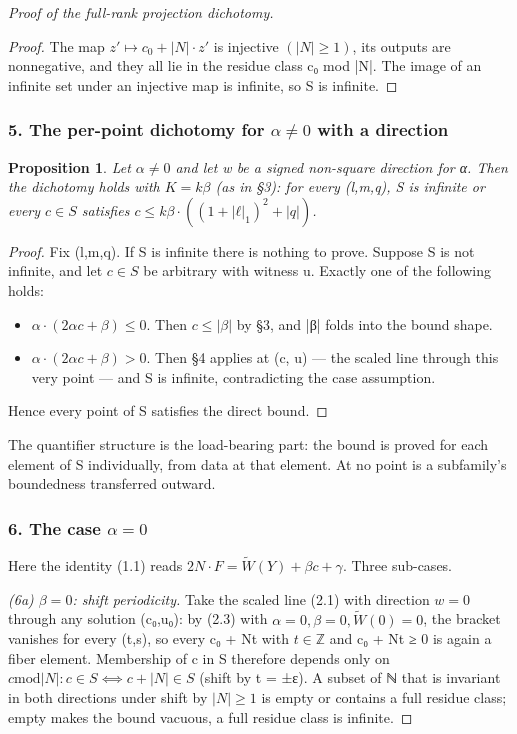 \documentclass[11pt]{article}
\theoremstyle{plain}
\theoremstyle{definition}
\theoremstyle{remark}
\theoremstyle{plain}
\newtheorem*{proposition*}{Proposition}
\theoremstyle{definition}
\theoremstyle{remark}
\theoremstyle{plain}
\theoremstyle{definition}
\theoremstyle{remark}
\begin{document}
\begin{proof}[Proof of the full-rank projection dichotomy]
\begin{proof}
The map $z′ ↦ c_{0} + |N|·z′$ is injective $(|N| ≥ 1)$, its outputs are nonnegative, and they all lie in the residue class c₀ mod |N|. The image of an infinite set under an injective map is infinite, so S is infinite.

\end{proof}
\subsubsection*{5. The per-point dichotomy for $α ≠ 0$ with a direction}
\begin{proposition*}
Let $α ≠ 0$ and let w be a signed non-square direction for α. Then the dichotomy holds with $K = kβ$ (as in §3): for every (l,m,q), S is infinite or every $c ∈ S$ satisfies $c ≤ kβ·((1+|ℓ|_{1})^{2}+|q|)$.

\end{proposition*}
\begin{proof}
Fix (l,m,q). If S is infinite there is nothing to prove. Suppose S is not infinite, and let $c ∈ S$ be arbitrary with witness u. Exactly one of the following holds:

\begin{itemize}
\item $α·(2αc+β) ≤ 0$. Then $c ≤ |β|$ by §3, and |β| folds into the bound shape.
\item $α·(2αc+β) > 0$. Then §4 applies at (c, u) — the scaled line through this
very point — and S is infinite, contradicting the case assumption.

\end{itemize}
Hence every point of S satisfies the direct bound.

\end{proof}
The quantifier structure is the load-bearing part: the bound is proved for each element of S individually, from data at that element. At no point is a subfamily's boundedness transferred outward.

\subsubsection*{6. The case $α = 0$}
Here the identity (1.1) reads $2N·F = \tilde{W}(Y) + βc + γ$. Three sub-cases.

\emph{(6a) $β = 0$: shift periodicity.} Take the scaled line (2.1) with direction $w = 0$ through any solution (c₀,u₀): by (2.3) with $α = 0, β = 0, \tilde{W}(0) = 0$, the bracket vanishes for every (t,s), so every c₀ + Nt with $t ∈ ℤ$ and c₀ + Nt ≥ 0 is again a fiber element. Membership of c in S therefore depends only on $c \mathrm{mod} |N|: c ∈ S ⟺ c + |N| ∈ S$ (shift by t = ±ε). A subset of ℕ that is invariant in both directions under shift by $|N| ≥ 1$ is empty or contains a full residue class; empty makes the bound vacuous, a full residue class is infinite.


\end{proof}
\end{document}
